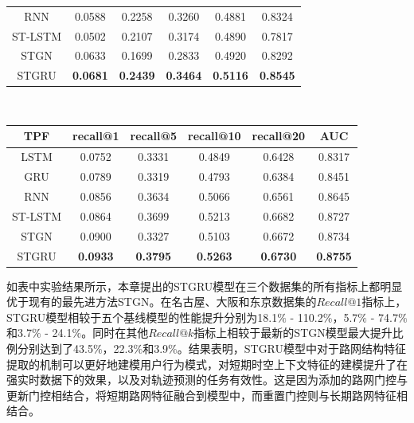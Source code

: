 \documentclass[master]{thesis-uestc}
\begin{document}
\begin{table}[!ht]
{\begin{tabular}{cccccc}
RNN     & 0.0588 & 0.2258 & 0.3260 & 0.4881 & 0.8324 \\

ST-LSTM & 0.0502 & 0.2107 & 0.3174 & 0.4890 & 0.7817 \\

STGN    & 0.0633 & 0.1699 & 0.2833 & 0.4920 & 0.8292 \\

STGRU   & \textbf{0.0681} & \textbf{0.2439} & \textbf{0.3464} & \textbf{0.5116} & \textbf{0.8545} \\
\bottomrule[1.5pt] %
\end{tabular}
\\
\centering
\begin{tabular}{cccccc}%
\toprule[1.5pt]  %
\textbf{TPF}  & recall@1 & recall@5 & recall@10 & recall@20 & AUC\\
\midrule[0.75pt]
LSTM    & 0.0752 & 0.3331 & 0.4849 & 0.6428 & 0.8317 \\

GRU     & 0.0789 & 0.3319 & 0.4793 & 0.6384 & 0.8451 \\

RNN     & 0.0856 & 0.3634 & 0.5066 & 0.6561 & 0.8645 \\

ST-LSTM & 0.0864 & 0.3699 & 0.5213 & 0.6682 & 0.8727 \\

STGN    & 0.0900 & 0.3327 & 0.5103 & 0.6672 & 0.8734 \\

STGRU   & \textbf{0.0933} & \textbf{0.3795} & \textbf{0.5263} & \textbf{0.6730} & \textbf{0.8755} \\
\bottomrule[1.5pt] %
\end{tabular}}
\end{table}

如表中实验结果所示，本章提出的STGRU模型在三个数据集的所有指标上都明显优于现有的最先进方法STGN。在名古屋、大阪和东京数据集的$Recall@1$指标上，STGRU模型相较于五个基线模型的性能提升分别为18.1$\%$ - 110.2$\%$，5.7$\%$ - 74.7$\%$和3.7$\%$ - 24.1$\%$。同时在其他$Recall@k$指标上相较于最新的STGN模型最大提升比例分别达到了43.5$\%$，22.3$\%$和3.9$\%$。结果表明，STGRU模型中对于路网结构特征提取的机制可以更好地建模用户行为模式，对短期时空上下文特征的建模提升了在强实时数据下的效果，以及对轨迹预测的任务有效性。这是因为添加的路网门控与更新门控相结合，将短期路网特征融合到模型中，而重置门控则与长期路网特征相结合。
\end{document}

